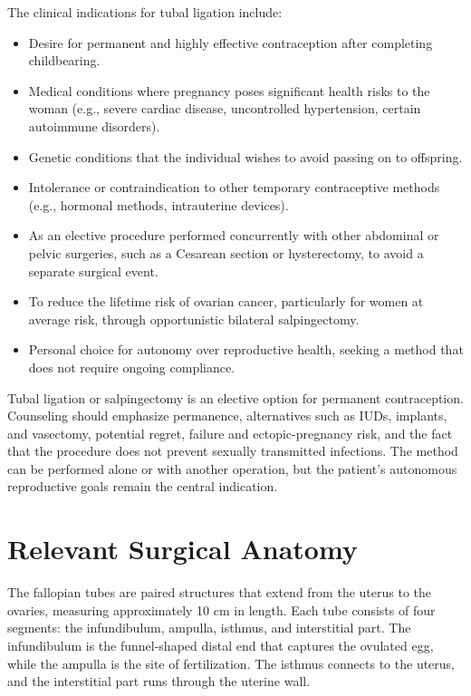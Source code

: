 The clinical indications for tubal ligation include:

\begin{itemize}
  \item Desire for permanent and highly effective contraception after completing childbearing.
  \item Medical conditions where pregnancy poses significant health risks to the woman (e.g., severe cardiac disease, uncontrolled hypertension, certain autoimmune disorders).
  \item Genetic conditions that the individual wishes to avoid passing on to offspring.
  \item Intolerance or contraindication to other temporary contraceptive methods (e.g., hormonal methods, intrauterine devices).
  \item As an elective procedure performed concurrently with other abdominal or pelvic surgeries, such as a Cesarean section or hysterectomy, to avoid a separate surgical event.
  \item To reduce the lifetime risk of ovarian cancer, particularly for women at average risk, through opportunistic bilateral salpingectomy.
  \item Personal choice for autonomy over reproductive health, seeking a method that does not require ongoing compliance.
\end{itemize}

Tubal ligation or salpingectomy is an elective option for permanent contraception. Counseling should emphasize permanence, alternatives such as IUDs, implants, and vasectomy, potential regret, failure and ectopic-pregnancy risk, and the fact that the procedure does not prevent sexually transmitted infections. The method can be performed alone or with another operation, but the patient’s autonomous reproductive goals remain the central indication.

\section*{Relevant Surgical Anatomy}
The fallopian tubes are paired structures that extend from the uterus to the ovaries, measuring approximately 10 cm in length. Each tube consists of four segments: the infundibulum, ampulla, isthmus, and interstitial part. The infundibulum is the funnel-shaped distal end that captures the ovulated egg, while the ampulla is the site of fertilization. The isthmus connects to the uterus, and the interstitial part runs through the uterine wall. 


